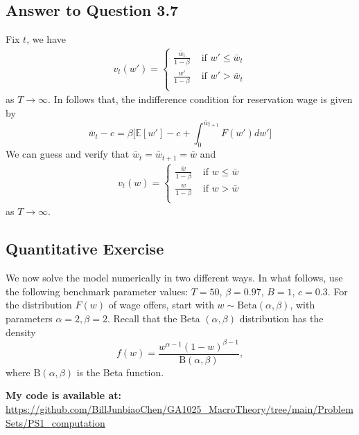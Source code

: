 \documentclass[11pt]{article}
\theoremstyle{definition}
\theoremstyle{boldtitle} %
\numberwithin{equation}{section}
\numberwithin{figure}{section}
\numberwithin{table}{section}
\begin{document}
\subsection*{Answer to Question 3.7}
Fix $t$, we have
\begin{align*}
v_{t}(w') =
\begin{cases} 
  \frac{\bar{w}_t}{1 - \beta} & \text{ if } w' \leq \bar{w}_t \\[10pt]
  \frac{w'}{1 - \beta} & \text{ if } w' > \bar{w}_t \\[10pt]
\end{cases}
\end{align*}
as $T \rightarrow \infty$.
In follows that, the indifference condition for reservation wage is given by
\[
\bar{w}_t - c = \beta \bigg[ \mathbb{E}[w'] - c + \int_0^{\bar{w}_{t+1}} F(w') dw'\bigg]
\]
We can guess and verify that $\bar{w}_t = \bar{w}_{t+1} = \bar{w}$ and 
\begin{align*}
v_{t}(w) =
\begin{cases} 
  \frac{\bar{w}}{1 - \beta} & \text{ if } w \leq \bar{w} \\[10pt]
  \frac{w}{1 - \beta} & \text{ if } w > \bar{w} \\[10pt]
\end{cases}
\end{align*}
as $T\rightarrow \infty$.



\subsection*{Quantitative Exercise}

We now solve the model numerically in two different ways. 
In what follows, use the 
following benchmark parameter values: \( T = 50 \), \( \beta = 0.97 \), \( B = 1 \), \( c = 0.3 \). 
For the distribution \( F(w) \) of wage offers, start with \( w \sim \text{Beta}(\alpha, \beta) \), 
with parameters \( \alpha = 2, \beta = 2 \). 
Recall that the Beta \((\alpha, \beta)\) distribution 
has the density
\[
f(w) = \frac{w^{\alpha - 1} (1 - w)^{\beta - 1}}{\text{B}(\alpha, \beta)},
\]
where \(\text{B}(\alpha, \beta)\) is the Beta function.


\textbf{My code is available at:} \\
\url{https://github.com/BillJunbiaoChen/GA1025_MacroTheory/tree/main/ProblemSets/PS1_computation}
\end{document}

